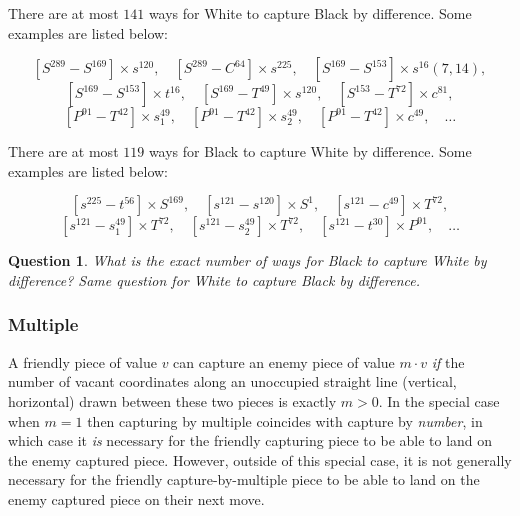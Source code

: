 \documentclass[14pt]{extarticle}
\newtheorem{question}{Question}
\begin{document}


There are at most $141$ ways for White to capture Black by difference.
Some examples are listed below:

\[
[S^{289}   -  S^{169}]  \times  s^{120},\quad
[S^{289}   -  C^{64}]  \times  s^{225},\quad
[S^{169}   -  S^{153}]  \times  s^{16} (7, 14),
\]
\[
[S^{169}   -  S^{153}]  \times  t^{16},\quad
[S^{169}   -  T^{49}]  \times  s^{120},\quad
[S^{153}   -  T^{72}]  \times  c^{81},
\]
\[
[P^{91}   -  T^{42}]  \times  s_1^{49},\quad
[P^{91}   -  T^{42}]  \times  s_2^{49},\quad
[P^{91}   -  T^{42}]  \times  c^{49}, \quad \dots 
\]

There are at most $119$ ways for Black to capture White by difference.
Some examples are listed below:

\[
[s^{225}   -  t^{56}]  \times  S^{169},\quad
[s^{121}   -  s^{120}]  \times  S^{1} ,\quad
[s^{121}   -  c^{49}] \times  T^{72},
\]
\[
[s^{121}   -  s_1^{49}] \times  T^{72},\quad
[s^{121}   -  s_2^{49}] \times  T^{72},\quad
[s^{121}   -  t^{30}]  \times  P^{91}, \quad \dots
\]


\begin{question}
What is the exact number of ways for Black to capture White by difference?
Same question for White to capture Black by difference.
\end{question}

\subsubsection{Multiple}

A friendly piece of value $v$ can capture an enemy piece of value
$m {\cdot} v$ {\it if} the number of vacant coordinates
along an unoccupied straight line (vertical, horizontal)
drawn between these two pieces is exactly $m>0$.
In the special case when
$m=1$ then capturing by multiple coincides with capture by
{\it number}, in which case
it {\it is} necessary for the friendly capturing piece to
be able to land on the enemy captured piece.
However, outside of this special case, it is not generally
necessary for the friendly capture-by-multiple piece
to be able to land on the enemy captured piece on their next move.
\end{document}
